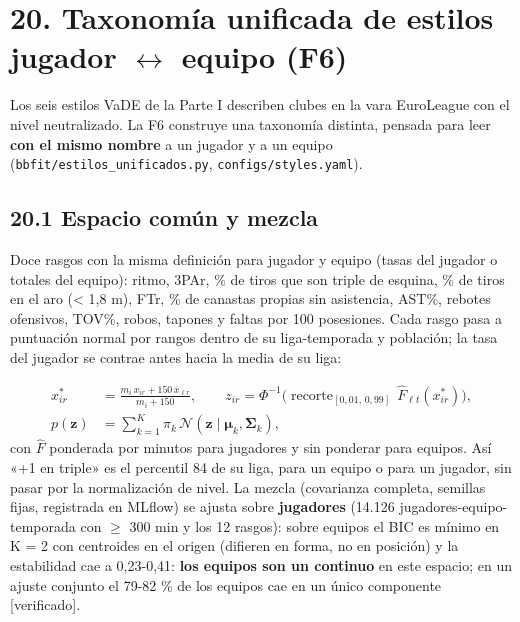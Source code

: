 \documentclass[10pt,a4paper]{article}
\begin{document}
\section*{20. Taxonomía unificada de estilos jugador \ensuremath{\leftrightarrow} equipo (F6)}
Los seis estilos VaDE de la Parte I describen clubes en la vara EuroLeague con el nivel neutralizado. La F6 construye una taxonomía distinta, pensada para leer \textbf{con el mismo nombre} a un jugador y a un equipo (\texttt{bbfit/\allowbreak{}estilos\_unificados.py}, \texttt{configs/\allowbreak{}styles.yaml}).

\subsection*{20.1 Espacio común y mezcla}
Doce rasgos con la misma definición para jugador y equipo (tasas del jugador o totales del equipo): ritmo, 3PAr, \% de tiros que son triple de esquina, \% de tiros en el aro (< 1,8 m), FTr, \% de canastas propias sin asistencia, AST\%, rebotes ofensivos, TOV\%, robos, tapones y faltas por 100 posesiones. Cada rasgo pasa a puntuación normal por rangos dentro de su liga-temporada y población; la tasa del jugador se contrae antes hacia la media de su liga:

\[
\begin{aligned} x^{*}_{ir} &= \frac{m_i\,x_{ir} + 150\,\bar x_{\ell r}}{m_i + 150}, \qquad z_{ir} = \Phi^{-1}\!\big(\operatorname{recorte}_{[0{,}01,\,0{,}99]}\,\hat F_{\ell t}(x^{*}_{ir})\big),\\ p(\mathbf z) &= \sum_{k=1}^{K}\pi_k\,\mathcal N(\mathbf z \mid \boldsymbol\mu_k, \boldsymbol\Sigma_k) , \end{aligned}
\]
con $\hat F$ ponderada por minutos para jugadores y sin ponderar para equipos. Así «+1 en triple» es el percentil 84 de su liga, para un equipo o para un jugador, sin pasar por la normalización de nivel. La mezcla (covarianza completa, semillas fijas, registrada en MLflow) se ajusta sobre \textbf{jugadores} (14.126 jugadores-equipo-temporada con \ensuremath{\geq} 300 min y los 12 rasgos): sobre equipos el BIC es mínimo en K = 2 con centroides en el origen (difieren en forma, no en posición) y la estabilidad cae a 0,23-0,41: \textbf{los equipos son un continuo} en este espacio; en un ajuste conjunto el 79-82 \% de los equipos cae en un único componente [verificado].
\end{document}
